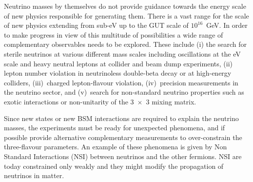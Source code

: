 Neutrino masses by themselves do not provide guidance towards the energy scale of new physics responsible for generating them. There is a vast range for the scale of new physics extending from sub-eV up to the GUT scale of $10^{16}$~GeV. In order to make progress in view of this multitude of possibilities a wide range of complementary observables needs to be explored. These include (i) the search for sterile neutrinos at various different mass scales including oscillations at the eV scale and heavy neutral leptons at collider and beam dump experiments, (ii) lepton number violation in neutrinoless double-beta decay or at high-energy colliders, (iii)~charged lepton-flavour violation, (iv)~precision measurements in the neutrino sector, and (v)~search for non-standard neutrino properties such as exotic interactions or non-unitarity of the \mbox{3 $\times$ 3} mixing matrix.

Since new states or new BSM interactions are required to explain the neutrino masses, the experiments must be ready for unexpected phenomena, and if possible provide alternative complementary measurements to over-constrain the three-flavour parameters. An example of these phenomena is given by Non Standard Interactions (NSI) between neutrinos and the other fermions. NSI are today constrained only weakly and they might modify the propagation of neutrinos in matter. 


